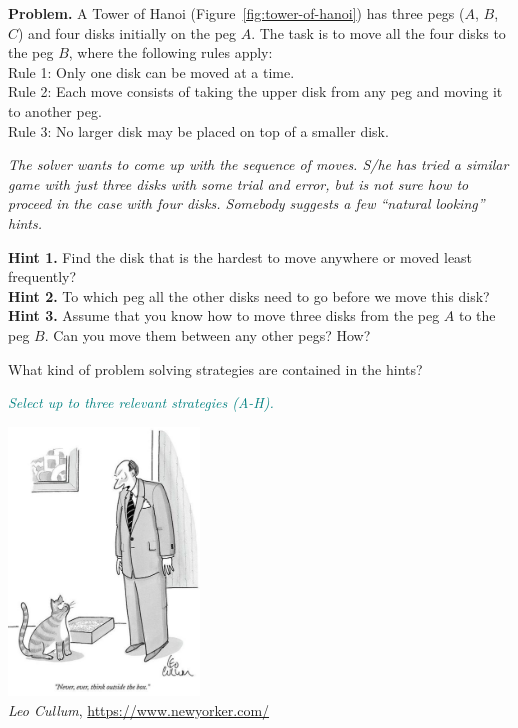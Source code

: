 \documentclass[jou]{apa6}
\begin{document}
\begin{mdframed}[roundcorner=6pt]
{\footnotesize
{\bf Problem.} A Tower of Hanoi (Figure~\ref{fig:tower-of-hanoi}) 
has three pegs ($A$, $B$, $C$) and
four disks initially on the peg $A$. The task is to move all the four disks to the peg $B$, where
the following rules apply:\\
Rule 1: Only one disk can be moved at a time.\\
Rule 2: Each move consists of taking the upper disk from any peg and moving it to 
another peg.\\
Rule 3: No larger disk may be placed on top of a smaller disk.

{\em The solver wants to come up with the sequence of moves. S/he has tried
a similar game with just three disks with some trial and error, but 
is not sure how to proceed in the case with four disks. Somebody suggests 
a few ``natural looking'' hints.}

{\bf Hint 1.} Find the disk that is the hardest to move anywhere or moved least frequently?\\
{\bf Hint 2.} To which peg all the other disks need to go before we move this disk?\\
{\bf Hint 3.} Assume that you know how to move three disks from the peg $A$ to the peg $B$. 
Can you move them between any other pegs? How?
}
\end{mdframed}


What kind of problem solving strategies are contained in the hints?

\textcolor{teal}{\em Select up to three relevant strategies (A-H).}



\begin{center}
\includegraphics[width=2in]{quiz-on-individual-topics/thinking-outside-the-box.png}\\
\textcopyright{} {\em Leo Cullum}, \url{https://www.newyorker.com/}
\end{center}
\end{document}
